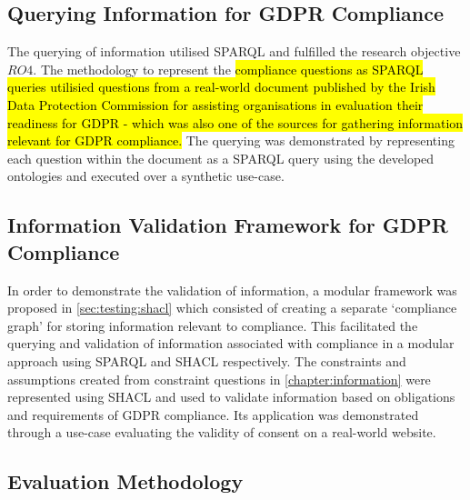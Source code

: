 \subsection{Querying Information for GDPR Compliance}
The querying of information utilised SPARQL and fulfilled the research objective $RO4$.
The methodology to represent the \hl{compliance questions as SPARQL queries utilisied questions from a real-world document published by the Irish Data Protection Commission for assisting organisations in evaluation their readiness for GDPR - which was also one of the sources for gathering information relevant for GDPR compliance.}
The querying was demonstrated by representing each question within the document as a SPARQL query using the developed ontologies and executed over a synthetic use-case.

\subsection{Information Validation Framework for GDPR Compliance}
In order to demonstrate the validation of information, a modular framework was proposed in \autoref{sec:testing:shacl} which consisted of creating a separate `compliance graph' for storing information relevant to compliance.
This facilitated the querying and validation of information associated with compliance in a modular approach using SPARQL and SHACL respectively.
The constraints and assumptions created from constraint questions in \autoref{chapter:information} were represented using SHACL and used to validate information based on obligations and requirements of GDPR compliance.
Its application was demonstrated through a use-case evaluating the validity of consent on a real-world website.

\subsection{Evaluation Methodology}\label{sec:intro:evaluation}
